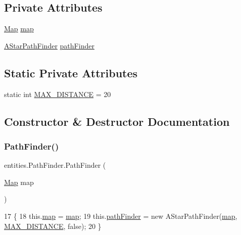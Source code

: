 \subsection*{Private Attributes}
\begin{DoxyCompactItemize}
\item 
\mbox{\hyperlink{classentities_1_1_map}{Map}} \mbox{\hyperlink{classentities_1_1_path_finder_a55024473615fc2ba75d7faf5dcd78b3f}{map}}
\item 
\mbox{\hyperlink{classorg_1_1newdawn_1_1slick_1_1util_1_1pathfinding_1_1_a_star_path_finder}{A\+Star\+Path\+Finder}} \mbox{\hyperlink{classentities_1_1_path_finder_a3ee55002f6ed410109207b43757e93f7}{path\+Finder}}
\end{DoxyCompactItemize}
\subsection*{Static Private Attributes}
\begin{DoxyCompactItemize}
\item 
static int \mbox{\hyperlink{classentities_1_1_path_finder_a851c29b8b7dda1ff3488998c540dafc3}{M\+A\+X\+\_\+\+D\+I\+S\+T\+A\+N\+CE}} = 20
\end{DoxyCompactItemize}


\subsection{Constructor \& Destructor Documentation}
\mbox{\label{classentities_1_1_path_finder_afcf6c2098929ad2f90bcc34875a0902f}} 
\subsubsection{\texorpdfstring{Path\+Finder()}{PathFinder()}}
{\footnotesize\ttfamily entities.\+Path\+Finder.\+Path\+Finder (\begin{DoxyParamCaption}\item[{\mbox{\hyperlink{classentities_1_1_map}{Map}}}]{map }\end{DoxyParamCaption})\hspace{0.3cm}{\ttfamily [inline]}}


\begin{DoxyCode}
17                                \{
18         this.\mbox{\hyperlink{classentities_1_1_path_finder_a55024473615fc2ba75d7faf5dcd78b3f}{map}} = \mbox{\hyperlink{classentities_1_1_path_finder_a55024473615fc2ba75d7faf5dcd78b3f}{map}};
19         this.\mbox{\hyperlink{classentities_1_1_path_finder_a3ee55002f6ed410109207b43757e93f7}{pathFinder}} = \textcolor{keyword}{new} AStarPathFinder(\mbox{\hyperlink{classentities_1_1_path_finder_a55024473615fc2ba75d7faf5dcd78b3f}{map}}, \mbox{\hyperlink{classentities_1_1_path_finder_a851c29b8b7dda1ff3488998c540dafc3}{MAX\_DISTANCE}}, \textcolor{keyword}{false});
20     \}
\end{DoxyCode}


